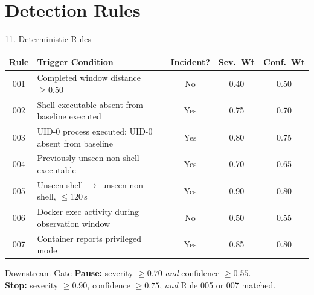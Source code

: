 \documentclass[aspectratio=169,10pt]{beamer}
\begin{document}
\section{Detection Rules}
\begin{frame}{11. Deterministic Rules}
\small
\vspace{0.15cm}
\begin{table}
\centering
\renewcommand{\arraystretch}{1.35}
\begin{tabularx}{0.98\textwidth}{c X c c c}
\toprule
\textbf{Rule} & \textbf{Trigger Condition} & \textbf{Incident?} & \textbf{Sev.\ Wt} & \textbf{Conf.\ Wt} \\
\midrule
001 & Completed window distance $\geq 0.50$               & No  & 0.40 & 0.50 \\
002 & Shell executable absent from baseline executed      & Yes & 0.75 & 0.70 \\
003 & UID-0 process executed; UID-0 absent from baseline  & Yes & 0.80 & 0.75 \\
004 & Previously unseen non-shell executable              & Yes & 0.70 & 0.65 \\
005 & Unseen shell $\to$ unseen non-shell, $\leq120$\,s   & Yes & 0.90 & 0.80 \\
006 & Docker exec activity during observation window      & No  & 0.50 & 0.55 \\
007 & Container reports privileged mode                   & Yes & 0.85 & 0.80 \\
\bottomrule
\end{tabularx}
\end{table}

\vspace{0.1cm}
\begin{block}{Downstream Gate}
\small
\textbf{Pause:} severity $\geq 0.70$ \emph{and} confidence $\geq 0.55$.\\
\textbf{Stop:} severity $\geq 0.90$, confidence $\geq 0.75$, \emph{and} Rule 005 or 007 matched.
\end{block}
\end{frame}
\end{document}
